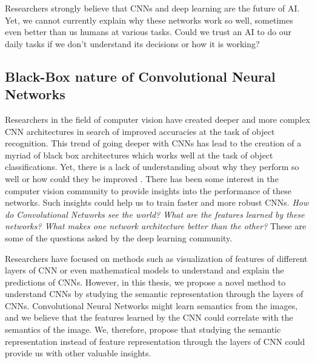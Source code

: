 Researchers strongly believe that CNNs and deep learning are the future of AI. Yet, we cannot currently explain why these networks work so well, sometimes even better than us humans at various tasks. Could we trust an AI to do our daily tasks if we don't understand its decisions or how it is working?


\subsection{Black-Box nature of Convolutional Neural Networks}

Researchers in the field of computer vision have created deeper and more complex CNN architectures in search of improved accuracies at the task of object recognition. This trend of going deeper with CNNs has lead to the creation of a myriad of black box architectures which works well at the task of object classifications. Yet, there is a lack of understanding about why they perform so well or how could they be improved \cite{CNNVisual1}. There has been some interest in the computer vision community to provide insights into the performance of these networks. Such insights could help us to train faster and more robust CNNs. \textit{How do Convolutional Networks see the world? What are the features learned by these networks? What makes one network architecture better than the other?} These are some of the questions asked by the deep learning community.

Researchers have focused on methods such as visualization of features of different layers of CNN \cite{CNNVisual1, CNNVisual2, CNNVisual3} or even mathematical models \cite{CNNVisual4} to understand and explain the predictions of CNNs. However, in this thesis, we propose a novel method to understand CNNs by studying the semantic representation through the layers of CNNs. Convolutional Neural Networks might learn semantics from the images, and we believe that the features learned by the CNN could correlate with the semantics of the image. We, therefore, propose that studying the semantic representation instead of feature representation through the layers of CNN could provide us with other valuable insights. 

